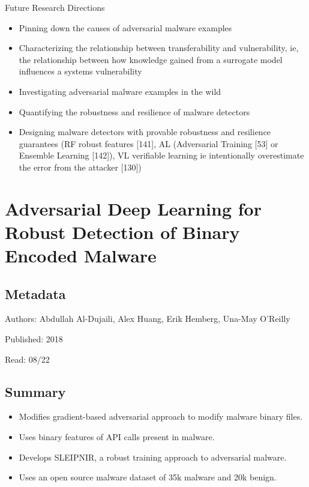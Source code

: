\documentclass{article}
\begin{document}
\noindent Future Research Directions
\begin{itemize}
\item Pinning down the causes of adversarial malware examples
\item Characterizing the relationship between transferability and vulnerability, ie, the relationship between how knowledge gained from a surrogate model influences a systems vulnerability
\item Investigating adversarial malware examples in the wild
\item Quantifying the robustness and resilience of malware detectors
\item Designing malware detectors with provable robustness and resilience guarantees (RF robust features [141], AL (Adversarial Training [53] or Ensemble Learning [142]), VL verifiable learning ie intentionally overestimate the error from the attacker [130])
\end{itemize}
\pagebreak


\section*{Adversarial Deep Learning for Robust Detection of Binary Encoded Malware}

\subsection*{Metadata}

\noindent Authors: Abdullah Al-Dujaili, Alex Huang, Erik Hemberg, Una-May O’Reilly

\noindent Published: 2018

\noindent Read: 08/22

\subsection*{Summary}
\begin{itemize}
\item Modifies gradient-based adversarial approach to modify malware binary files.
\item Uses binary features of API calls present in malware.
\item Develops SLEIPNIR, a robust training approach to adversarial malware.
\item Uses an open source malware dataset of 35k malware and 20k benign.
\end{itemize}
\end{document}
